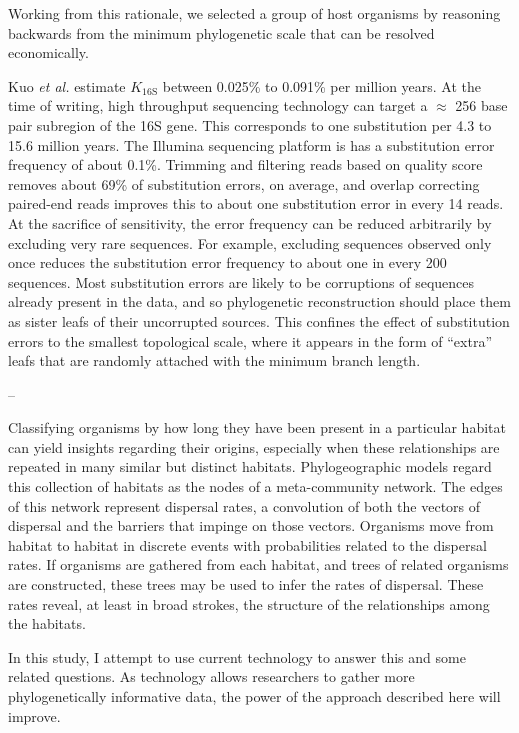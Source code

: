 Working from this rationale, we selected a group of host organisms by reasoning backwards from the minimum phylogenetic scale that can be resolved economically. 

Kuo {\em et al.} estimate $K_{\mathrm{16S}}$ between 0.025\% to 0.091\% per million years. \cite{kuo2009inferring} At the time of writing, high throughput sequencing technology can target a $\approx$ 256 base pair subregion of the 16S gene. This corresponds to one substitution per 4.3 to 15.6 million years. The Illumina sequencing platform is has a substitution error frequency of about 0.1\%. \cite{ross2013characterizing} Trimming and filtering reads based on quality score removes about 69\% of substitution errors, on average, \cite{schirmer2016illumina} and overlap correcting paired-end reads improves this to about one substitution error in every 14 reads. \cite{bolger2014trimmomatic} At the sacrifice of sensitivity, the error frequency can be reduced arbitrarily by excluding very rare sequences. For example, excluding sequences observed only once reduces the substitution error frequency to about one in every 200 sequences. Most substitution errors are likely to be corruptions of sequences already present in the data, and so phylogenetic reconstruction should place them as sister leafs of their uncorrupted sources. This confines the effect of substitution errors to the smallest topological scale, where it appears in the form of ``extra'' leafs that are randomly attached with the minimum branch length.

--

Classifying organisms by how long they have been present in a particular habitat can yield insights regarding their origins, especially when these relationships are repeated in many similar but distinct habitats. Phylogeographic models regard this collection of habitats as the nodes of a meta-community network. The edges of this network represent dispersal rates, a convolution of both the vectors of dispersal and the barriers that impinge on those vectors. Organisms move from habitat to habitat in discrete events with probabilities related to the dispersal rates. If organisms are gathered from each habitat, and trees of related organisms are constructed, these trees may be used to infer the rates of dispersal. These rates reveal, at least in broad strokes, the structure of the relationships among the habitats.



In this study, I attempt to use current technology to answer this and some related questions. As technology allows researchers to gather more phylogenetically informative data, the power of the approach described here will improve. 

